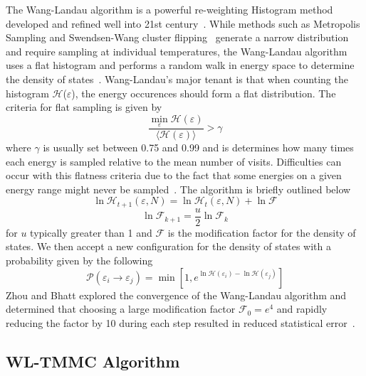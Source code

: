 \documentclass[letterpaper,twocolumn,amsmath,amssymb,pre,aps,10pt]{revtex4-1}
\begin{document}
The Wang-Landau algorithm is a powerful re-weighting Histogram method 
developed and refined well into 21st 
century~\cite{wang2001determining}.  While methods such as Metropolis 
Sampling and Swendsen-Wang cluster 
flipping~\cite{swendsen1987nonuniversal} generate a narrow distribution 
and require sampling at individual temperatures, the Wang-Landau 
algorithm uses a flat histogram and performs a random walk in energy 
space to determine the density of states~\cite{LandauMinSampling}.  
Wang-Landau's major tenant is that when counting the histogram 
$\mathcal{H}$($\varepsilon$), the energy occurences should form a flat 
distribution.  The criteria for flat sampling is given by 
\begin{equation}
	\frac{\min_{\varepsilon} \mathcal{H}(\varepsilon)}
	{\big\langle\mathcal{H}(\varepsilon)\big\rangle } 
	> \gamma 
\end{equation}
where $\gamma$ is usually set between 0.75 and 0.99 and is determines how many
times each energy is sampled relative to the mean number of visits.  Difficulties
can occur with this flatness criteria due to the fact that some energies on a
given energy range might never be sampled~\cite{haber2014transition}.  The algorithm
is briefly outlined below  
\begin{equation}
	\ln{\mathcal{H}_{t+1}(\varepsilon,N)}=\ln{\mathcal{H}_{t}(\varepsilon,N)}
	+\ln{\mathcal{F}}
\end{equation}
\begin{equation}
	\ln{\mathcal{F}_{k+1}}=\frac{u}{2}\ln{\mathcal{F}_{k}}
\end{equation}
for $u$ typically greater than 1 and $\mathcal{F}$ is the modification factor for
the density of states.  We then accept a new configuration for the density of 
states with a probability given by the following
\begin{equation}
	\mathcal{P}(\varepsilon_i \rightarrow \varepsilon_j) 
	= \min[1,e^{\ln{\mathcal{H}(\varepsilon_i)}-\ln{\mathcal{H}(\varepsilon_j)}}]
\end{equation}
Zhou and Bhatt explored the convergence of the Wang-Landau algorithm and 
determined that choosing a large modification factor $\mathcal{F}_0 = e^{4}$ and
rapidly reducing the factor by 10 during each step resulted in reduced statistical 
error~\cite{zhou2005understanding}.


\subsection{WL-TMMC Algorithm}
\end{document}
